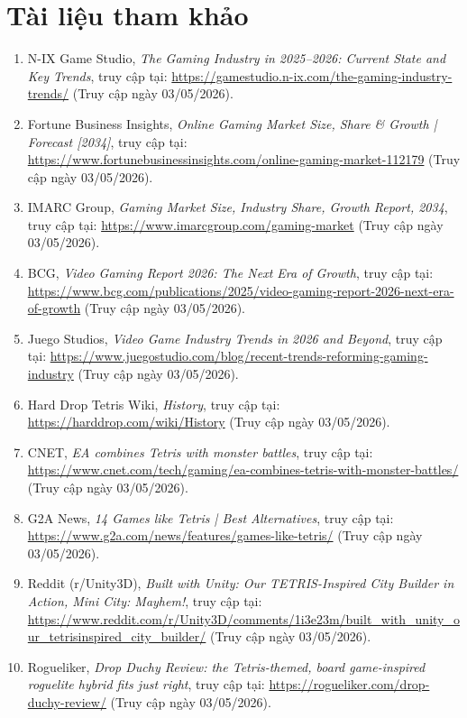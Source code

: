 \documentclass[12pt,a4paper]{article}
\begin{document}
\providecommand{\StandaloneSectionSetup}[2]{\ApplyStandardFooter{#1}{#2}}
\StandaloneSectionSetup{00-References.tex}{LastPageReferences}
\onehalfspacing

\section{Tài liệu tham khảo}
\begin{sloppypar}
\begin{enumerate}
    \item N-IX Game Studio, \textit{The Gaming Industry in 2025--2026: Current State and Key Trends}, truy cập tại: \url{https://gamestudio.n-ix.com/the-gaming-industry-trends/} (Truy cập ngày 03/05/2026).
    \item Fortune Business Insights, \textit{Online Gaming Market Size, Share \& Growth | Forecast [2034]}, truy cập tại: \url{https://www.fortunebusinessinsights.com/online-gaming-market-112179} (Truy cập ngày 03/05/2026).
    \item IMARC Group, \textit{Gaming Market Size, Industry Share, Growth Report, 2034}, truy cập tại: \url{https://www.imarcgroup.com/gaming-market} (Truy cập ngày 03/05/2026).
    \item BCG, \textit{Video Gaming Report 2026: The Next Era of Growth}, truy cập tại: \url{https://www.bcg.com/publications/2025/video-gaming-report-2026-next-era-of-growth} (Truy cập ngày 03/05/2026).
    \item Juego Studios, \textit{Video Game Industry Trends in 2026 and Beyond}, truy cập tại: \url{https://www.juegostudio.com/blog/recent-trends-reforming-gaming-industry} (Truy cập ngày 03/05/2026).
    \item Hard Drop Tetris Wiki, \textit{History}, truy cập tại: \url{https://harddrop.com/wiki/History} (Truy cập ngày 03/05/2026).
    \item CNET, \textit{EA combines Tetris with monster battles}, truy cập tại: \url{https://www.cnet.com/tech/gaming/ea-combines-tetris-with-monster-battles/} (Truy cập ngày 03/05/2026).
    \item G2A News, \textit{14 Games like Tetris | Best Alternatives}, truy cập tại: \url{https://www.g2a.com/news/features/games-like-tetris/} (Truy cập ngày 03/05/2026).
    \item Reddit (r/Unity3D), \textit{Built with Unity: Our TETRIS-Inspired City Builder in Action, Mini City: Mayhem!}, truy cập tại: \url{https://www.reddit.com/r/Unity3D/comments/1i3e23m/built_with_unity_our_tetrisinspired_city_builder/} (Truy cập ngày 03/05/2026).
    \item Rogueliker, \textit{Drop Duchy Review: the Tetris-themed, board game-inspired roguelite hybrid fits just right}, truy cập tại: \url{https://rogueliker.com/drop-duchy-review/} (Truy cập ngày 03/05/2026).
\end{enumerate}
\end{sloppypar}

\label{LastPageReferences}
\end{document}
